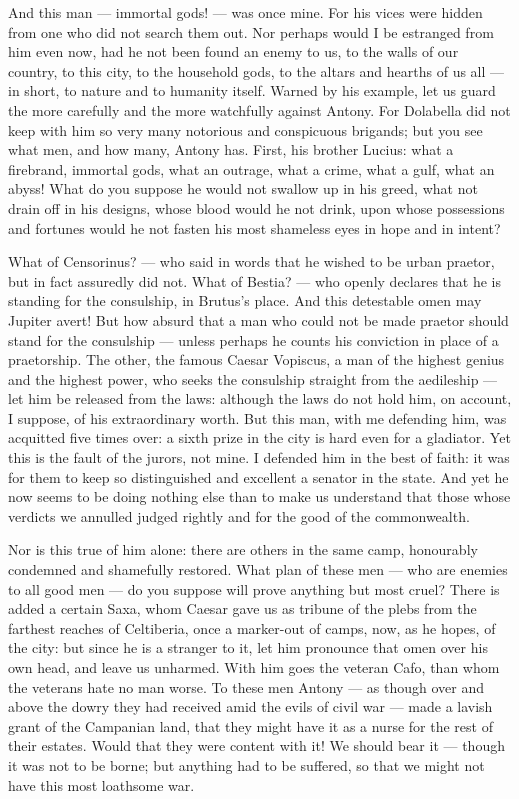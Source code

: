  And this man --- immortal gods! --- was once mine. For his vices were hidden from one who did not search them out. Nor perhaps would I be estranged from him even now, had he not been found an enemy to us, to the walls of our country, to this city, to the household gods, to the altars and hearths of us all --- in short, to nature and to humanity itself. Warned by his example, let us guard the more carefully and the more watchfully against Antony. For Dolabella did not keep with him so very many notorious and conspicuous brigands; but you see what men, and how many, Antony has. First, his brother Lucius: what a firebrand, immortal gods, what an outrage, what a crime, what a gulf, what an abyss! What do you suppose he would not swallow up in his greed, what not drain off in his designs, whose blood would he not drink, upon whose possessions and fortunes would he not fasten his most shameless eyes in hope and in intent?

 What of Censorinus? --- who said in words that he wished to be urban praetor, but in fact assuredly did not. What of Bestia? --- who openly declares that he is standing for the consulship, in Brutus's place. And this detestable omen may Jupiter avert! But how absurd that a man who could not be made praetor should stand for the consulship --- unless perhaps he counts his conviction in place of a praetorship. The other, the famous Caesar Vopiscus, a man of the highest genius and the highest power, who seeks the consulship straight from the aedileship --- let him be released from the laws: although the laws do not hold him, on account, I suppose, of his extraordinary worth. But this man, with me defending him, was acquitted five times over: a sixth prize in the city is hard even for a gladiator. Yet this is the fault of the jurors, not mine. I defended him in the best of faith: it was for them to keep so distinguished and excellent a senator in the state. And yet he now seems to be doing nothing else than to make us understand that those whose verdicts we annulled judged rightly and for the good of the commonwealth.

 Nor is this true of him alone: there are others in the same camp, honourably condemned and shamefully restored. What plan of these men --- who are enemies to all good men --- do you suppose will prove anything but most cruel? There is added a certain Saxa, whom Caesar gave us as tribune of the plebs from the farthest reaches of Celtiberia, once a marker-out of camps, now, as he hopes, of the city: but since he is a stranger to it, let him pronounce that omen over his own head, and leave us unharmed. With him goes the veteran Cafo, than whom the veterans hate no man worse. To these men Antony --- as though over and above the dowry they had received amid the evils of civil war --- made a lavish grant of the Campanian land, that they might have it as a nurse for the rest of their estates. Would that they were content with it! We should bear it --- though it was not to be borne; but anything had to be suffered, so that we might not have this most loathsome war.

